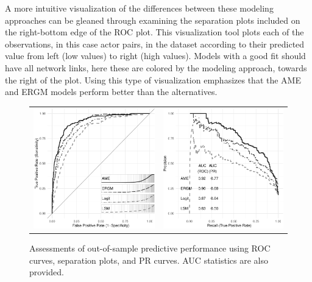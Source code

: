 \documentclass[12pt,pdflatex]{elsarticle}
\begin{document}
A more intuitive visualization of the differences between these modeling approaches can be gleaned through examining the separation plots included on the right-bottom edge of the ROC plot. This visualization tool plots each of the observations, in this case actor pairs, in the dataset according to their predicted value from left (low values) to right (high values). Models with a good fit should have all network links, here these are colored by the modeling approach, towards the right of the plot. Using this type of visualization emphasizes that the AME and ERGM models perform better than the alternatives.

\begin{figure}[ht]
	\centering
	\caption{Assessments of out-of-sample predictive performance using ROC curves, separation plots, and PR curves. AUC statistics are also provided.}
	\begin{tabular}{cc}
	\includegraphics[width=.5\textwidth]{Figure2a_bw} & 
	\includegraphics[width=.5\textwidth]{Figure2b_bw}	
	\end{tabular}
	\label{fig:roc}
\end{figure}
\end{document}
